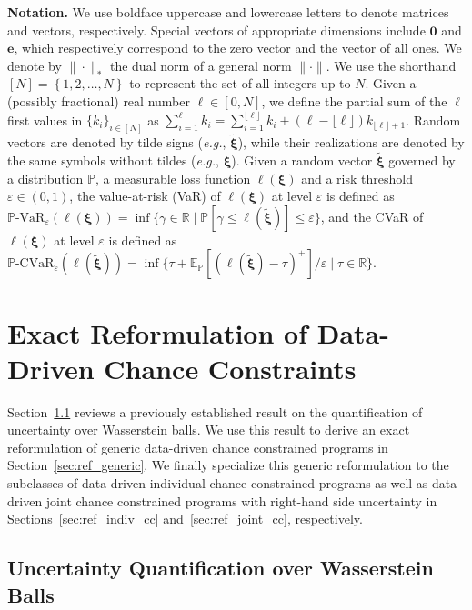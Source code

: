 \documentclass[nonblindrev]{informs2017}
\newcommand{\bmt}[1]{\tilde{\bm{#1}}}
\newcommand{\1}[1]{\mathds{1}{\left(#1\right)}}
\begin{document}
\vspace{5mm}
\noindent \textbf{Notation.}
We use boldface uppercase and lowercase letters to denote matrices and vectors, respectively. Special vectors of appropriate dimensions include $\bm{0}$ and $ \bm{e} $, which respectively correspond to the zero vector and the vector of all ones. We denote by $\|\cdot\|_*$ the dual norm of a general norm $\|\cdot\|$. We use the shorthand $ [N] = \left\{1,2,\ldots,N\right\} $ to represent the set of all integers up to $ N $. Given a (possibly fractional) real number $\ell\in [0,N]$, we define the partial sum of the $\ell$ first values in $\{k_i\}_{i \in [N]}$ as $\sum_{i = 1}^{\ell} k_i = \sum_{i = 1}^{\lfloor \ell \rfloor} k_i + (\ell - \lfloor \ell \rfloor) k_{\lfloor \ell \rfloor + 1}$.  Random vectors are denoted by tilde signs ({\em e.g.}, $\bmt{\xi}$), while their realizations are denoted by the same symbols without tildes ({\em e.g.}, $\bm{\xi}$). Given a random vector $\bmt{\xi}$ governed by a distribution $\mathbb{P}$, a measurable loss function $\ell (\bm{\xi})$ and a risk threshold $\varepsilon \in (0, 1)$, the value-at-risk (VaR) of $\ell (\bm{\xi})$ at level $\varepsilon$ is defined as $\mathbb{P}\text{-VaR}_{\varepsilon} (\ell (\bm{\xi})) = \inf\{\gamma \in \mathbb{R} \mid \mathbb{P}[\gamma \leq \ell(\bmt{\xi})] \leq \varepsilon\}$, and the CVaR of $\ell (\bm{\xi})$ at level $\varepsilon$ is defined as $\mathbb{P}\text{-CVaR}_{\varepsilon}(\ell(\bmt{\xi})) = \inf\{\tau + \mathbb{E}_{\mathbb{P}}[(\ell(\bmt{\xi}) - \tau)^+]/\varepsilon \mid \tau \in \mathbb{R}\}$.

\section{Exact Reformulation of Data-Driven Chance Constraints}\label{sec:exact_reformulation}
Section~\ref{sec:uq_wasserstein} reviews a previously established result on the quantification of uncertainty over Wasserstein balls. We use this result to derive an exact reformulation of generic data-driven chance constrained programs in Section~\ref{sec:ref_generic}. We finally specialize this generic reformulation to the subclasses of data-driven individual chance constrained programs as well as data-driven joint chance constrained programs with right-hand side uncertainty in Sections~\ref{sec:ref_indiv_cc} and~\ref{sec:ref_joint_cc}, respectively.

\subsection{Uncertainty Quantification over Wasserstein Balls}\label{sec:uq_wasserstein}
\end{document}
